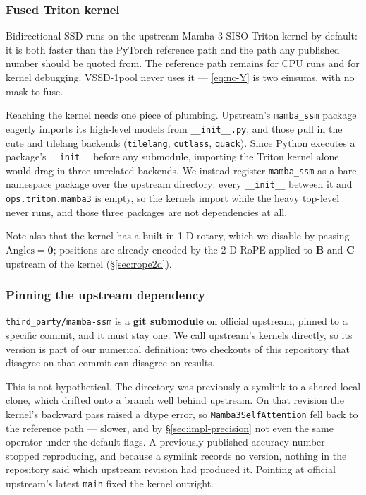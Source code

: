 \documentclass[11pt,a4paper]{article}
\begin{document}
\subsubsection{Fused Triton kernel}
\label{sec:impl-kernel}

Bidirectional SSD runs on the upstream Mamba-3 SISO Triton kernel by default: it
is both faster than the PyTorch reference path and the path any published
number should be quoted from. The reference path remains for CPU runs and for
kernel debugging. VSSD-1pool never uses it --- \eqref{eq:nc-Y} is two einsums, with
no mask to fuse.

Reaching the kernel needs one piece of plumbing. Upstream's \verb|mamba_ssm|
package eagerly imports its high-level models from \verb|__init__.py|, and those
pull in the cute and tilelang backends (\verb|tilelang|, \verb|cutlass|,
\verb|quack|). Since Python executes a package's \verb|__init__| before any
submodule, importing the Triton kernel alone would drag in three unrelated
backends. We instead register \verb|mamba_ssm| as a bare namespace package over
the upstream directory: every \verb|__init__| between it and
\verb|ops.triton.mamba3| is empty, so the kernels import while the heavy
top-level never runs, and those three packages are not dependencies at all.

Note also that the kernel has a built-in 1-D rotary, which we disable by passing
$\text{Angles}=\bm{0}$; positions are already encoded by the 2-D RoPE applied to
$\bm{B}$ and $\bm{C}$ upstream of the kernel (\S\ref{sec:rope2d}).

\subsubsection{Pinning the upstream dependency}
\label{sec:impl-pin}
\label{sec:impl-pinning}

\verb|third_party/mamba-ssm| is a \textbf{git submodule} on official upstream,
pinned to a specific commit, and it must stay one. We call upstream's kernels
directly, so its version is part of our numerical definition: two checkouts of
this repository that disagree on that commit can disagree on results.

This is not hypothetical. The directory was previously a symlink to a shared
local clone, which drifted onto a branch well behind upstream. On that revision
the kernel's backward pass raised a dtype error, so \verb|Mamba3SelfAttention|
fell back to the reference path --- slower, and by \S\ref{sec:impl-precision}
not even the same operator under the default flags. A previously published
accuracy number stopped reproducing, and because a symlink records no version,
nothing in the repository said which upstream revision had produced it. Pointing
at official upstream's latest \verb|main| fixed the kernel outright.
\end{document}
